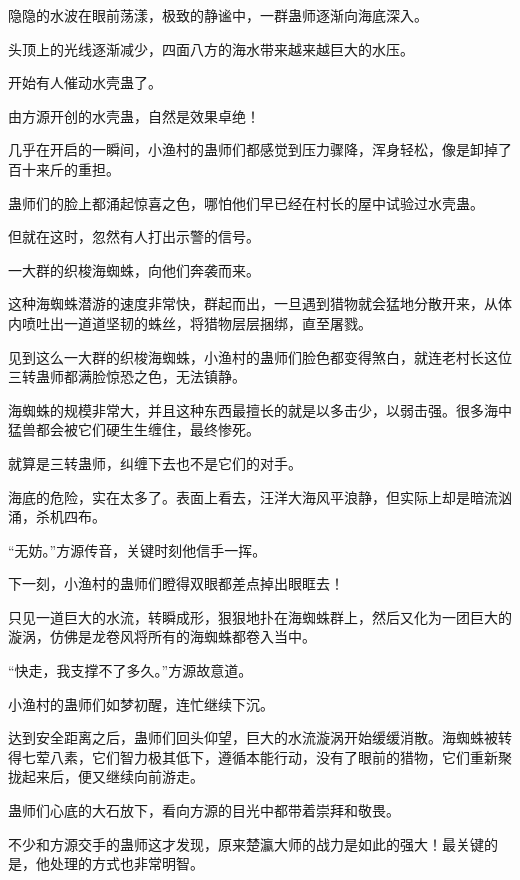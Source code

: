 
\begin{this_body}



隐隐的水波在眼前荡漾，极致的静谧中，一群蛊师逐渐向海底深入。

头顶上的光线逐渐减少，四面八方的海水带来越来越巨大的水压。

开始有人催动水壳蛊了。

由方源开创的水壳蛊，自然是效果卓绝！

几乎在开启的一瞬间，小渔村的蛊师们都感觉到压力骤降，浑身轻松，像是卸掉了百十来斤的重担。

蛊师们的脸上都涌起惊喜之色，哪怕他们早已经在村长的屋中试验过水壳蛊。

但就在这时，忽然有人打出示警的信号。

一大群的织梭海蜘蛛，向他们奔袭而来。

这种海蜘蛛潜游的速度非常快，群起而出，一旦遇到猎物就会猛地分散开来，从体内喷吐出一道道坚韧的蛛丝，将猎物层层捆绑，直至屠戮。

见到这么一大群的织梭海蜘蛛，小渔村的蛊师们脸色都变得煞白，就连老村长这位三转蛊师都满脸惊恐之色，无法镇静。

海蜘蛛的规模非常大，并且这种东西最擅长的就是以多击少，以弱击强。很多海中猛兽都会被它们硬生生缠住，最终惨死。

就算是三转蛊师，纠缠下去也不是它们的对手。

海底的危险，实在太多了。表面上看去，汪洋大海风平浪静，但实际上却是暗流汹涌，杀机四布。

“无妨。”方源传音，关键时刻他信手一挥。

下一刻，小渔村的蛊师们瞪得双眼都差点掉出眼眶去！

只见一道巨大的水流，转瞬成形，狠狠地扑在海蜘蛛群上，然后又化为一团巨大的漩涡，仿佛是龙卷风将所有的海蜘蛛都卷入当中。

“快走，我支撑不了多久。”方源故意道。

小渔村的蛊师们如梦初醒，连忙继续下沉。

达到安全距离之后，蛊师们回头仰望，巨大的水流漩涡开始缓缓消散。海蜘蛛被转得七荤八素，它们智力极其低下，遵循本能行动，没有了眼前的猎物，它们重新聚拢起来后，便又继续向前游走。

蛊师们心底的大石放下，看向方源的目光中都带着崇拜和敬畏。

不少和方源交手的蛊师这才发现，原来楚瀛大师的战力是如此的强大！最关键的是，他处理的方式也非常明智。


\end{this_body}
